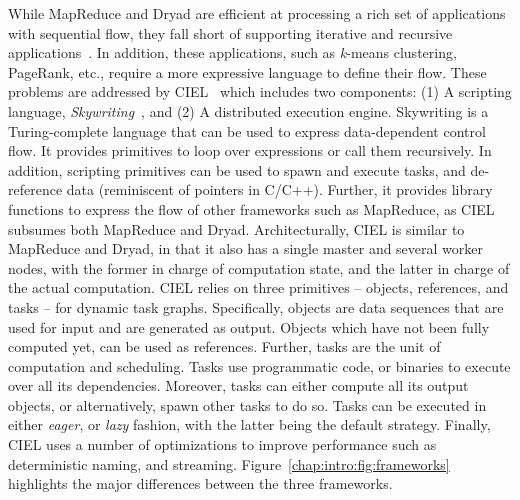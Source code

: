 \documentclass[a4paper,12pt,twoside,openright]{report}
\begin{document}
While MapReduce and Dryad are efficient at processing a rich set of applications
with sequential flow, they fall short of supporting iterative and recursive
applications~\cite{Bu:2010:HEI,Zaharia:2010:SCC}. In addition, these
applications, such as \emph{k}-means clustering, PageRank, etc., require a more
expressive language to define their flow. These problems are addressed by
CIEL~\cite{Murray:2011:CUE} which includes two components: (1) A scripting
language, \emph{Skywriting}~\cite{Murray:2010:SCS}, and (2) A distributed
execution engine. Skywriting is a Turing-complete language that can be used to
express data-dependent control flow. It provides primitives to loop over
expressions or call them recursively. In addition, scripting primitives can be
used to spawn and execute tasks, and de-reference data (reminiscent of pointers
in C/C++). Further, it provides library functions to express the flow of other
frameworks such as MapReduce, as CIEL subsumes both MapReduce and Dryad.
Architecturally, CIEL is similar to MapReduce and Dryad, in that it also has a
single master and several worker nodes, with the former in charge of computation
state, and the latter in charge of the actual computation.
CIEL relies on three primitives -- objects, references, and tasks -- for dynamic
task graphs. Specifically, objects are data sequences that are used for input
and are generated as output. Objects which have not been fully computed yet, can
be used as references. Further, tasks are the unit of computation and
scheduling. Tasks use programmatic code, or binaries to execute over all its
dependencies. Moreover, tasks can either compute all its output objects, or
alternatively, spawn other tasks to do so. Tasks can be executed in either
\emph{eager}, or \emph{lazy} fashion, with the latter being the default
strategy. Finally, CIEL uses a number of optimizations to improve performance
such as deterministic naming, and streaming.
Figure~\ref{chap:intro:fig:frameworks} highlights the major differences between
the three frameworks.
\end{document}
